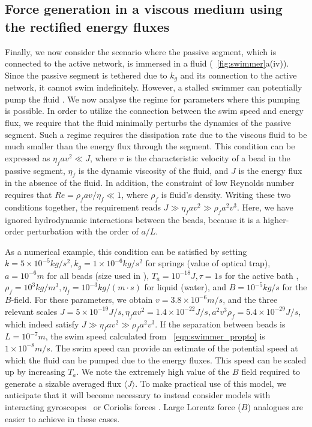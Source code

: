 \documentclass[
 preprint,
 preprintnumbers,
 amsmath,amssymb,
 aps,
 pre,
 longbibliography,
 superscriptaddress,
 10pt, twocolumn
]{revtex4-1}
\begin{document}
\subsection{Force generation in a viscous medium using the rectified energy fluxes}
\label{sec:pumping}
Finally, we now consider the scenario where the passive segment, which is connected to the active network, is immersed in a fluid (\figurename~\ref{fig:swimmer}a(iv)). Since the passive segment is tethered due to $k_g$ and its connection to the active network, it cannot swim indefinitely. However, a stalled swimmer can potentially pump the fluid \cite{Leoni2009BasicSwimmer}. We now analyse the regime for parameters where this pumping is possible.
In order to utilize the connection between the swim speed and energy flux, we require that the fluid minimally perturbs the dynamics of the passive segment. Such a regime requires the dissipation rate due to the viscous fluid to be much smaller than the energy flux through the segment. This condition can be expressed as $\eta_f a v^2 \ll J$, where $v$ is the characteristic velocity of a bead in the passive segment, $\eta_f$ is the dynamic viscosity of the fluid, and $J$ is the energy flux in the absence of the fluid.
In addition, the constraint of low Reynolds number requires that $Re = \rho_f a v /\eta_f \ll 1$, where $\rho_f$ is fluid's density.
Writing these two conditions together, the requirement reads $J \gg \eta_f a v^2 \gg \rho_f a^2 v^3$. 
Here, we have ignored hydrodynamic interactions between the beads, because it is a higher-order perturbation with the order of $a/L$. 

As a numerical example, this condition can be satisfied by setting $k=5\times 10^{-5} kg/s^2, k_g=1\times 10^{-6} kg/s^2$ for springs (value of optical trap), $a=10^{-6}m$ for all beads (size used in \cite{Leoni2009BasicSwimmer}), $T_a=10^{-18} J, \tau=1s$ for the active bath \cite{Wu2000ParticleDiffusion}, $\rho_f=10^3kg/m^3, \eta_f=10^{-3}kg/(m\cdot s)$ for liquid (water), and $B=10^{-5} kg/s$ for the $B$-field.
For these parameters, we obtain $v=3.8\times 10^{-6}m/s$, and the three relevant scales $J=5\times 10^{-19}J/s, \eta_f av^2=1.4\times 10^{-22}J/s, a^2v^3\rho_f=5.4\times 10^{-29}J/s$, which indeed satisfy $J \gg \eta_f a v^2 \gg \rho_f a^2 v^3$.
If the separation between beads is $L=10^{-7}m$, the swim speed calculated from \eqnname~\eqref{eqn:swimmer_propto} is $1\times 10^{-8} m/s$. 
The swim speed can provide an estimate of the potential speed at which the fluid can be pumped due to the energy fluxes. 
This speed can be scaled up by increasing $T_a$.
We note the extremely high value of the $B$ field required to generate a sizable averaged flux $\langle J \rangle$. To make practical use of this model, we anticipate that it will become necessary to instead consider models with interacting gyroscopes~\cite{Nash2015TopologicalMechanics} or Coriolis forces \cite{Kahlert2012MagnetizingComplex}. Large Lorentz force ($B$) analogues are easier to achieve in these cases. 
\end{document}
